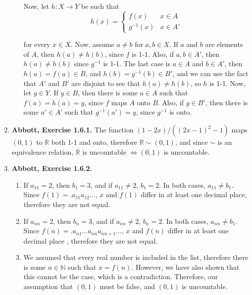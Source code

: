 \documentclass{article}
\newcommand{\N}{\mathbb{N}}
\newcommand{\R}{\mathbb{R}}
\newcommand{\exc}[2][Abbott]{\item \textbf{#1, Exercise #2.}}
\begin{document}
\begin{enumerate}
\begin{enumerate}
		      Now, let $h : X \rightarrow Y$ be such that 
		      \begin{equation*}
		      	h(x) = \begin{cases}
		      	f(x) & x \in A \\ 
		      	g^{-1}(x) & x \in A'
		      	\end{cases}
		      \end{equation*}
		      		      		      	      	      	      	              
		      for every $x \in X$. Now, assume $a \neq b$ for $a, b \in X$. If $a$ and $b$ are elements of $A$, then $h(a) \neq h(b)$, since $f$ is 1-1. Also, if $a,b \in A'$, then $h(a) \neq h(b)$ since $g^{-1}$ is 1-1. The last case is $a \in A$ and $b \in A'$, then $h(a)=f(a) \in B$, and $h(b)=g^{-1}(b) \in B'$, and we can use the fact that $A'$ and $B'$ are disjoint to see that $h(a) \neq h(b)$, so $h$ is 1-1. Now, let $y \in Y$. If $y \in B$, then there is some $a \in A$ such that $f(a)=h(a)=y$, since $f$ maps $A$ onto $B$. Also, if $y \in B'$, then there is some $a' \in A'$ such that $g^{-1}(a') = y$, since $g^{-1}$ is onto.
	\end{enumerate}
				      	          
	\exc{1.6.1}
	The function $(1-2x)/((2x-1)^2-1)$ maps $(0, 1)$ to $\R$ both 1-1 and onto, therefore $\R \sim (0, 1)$, and since $\sim$ is an equivalence relation, $\R$ is uncountable $\iff (0, 1)$ is uncountable. 
				      	          
	\exc{1.6.2}
	\begin{enumerate}
		\item If $a_{11} = 2$, then $b_1 = 3$, and if $a_{11} \neq 2$, $b_1 = 2$. In both cases, $a_{11} \neq b_1$. Since $f(1) = .a_{11} a_{12} \dots$, $x$ and $f(1)$ differ in at least one decimal place, therefore they are not equal.
		      		      		      	      	      	      	              
		\item If $a_{nn} = 2$, then $b_n = 3$, and if $a_{nn} \neq 2$, $b_n = 2$. In both cases, $a_{nn} \neq b_1$. Since $f(n) = .a_{n 1} \dots a_{nn} a_{n n+1} \dots$, $x$ and $f(n)$ differ in at least one decimal place , therefore they are not equal.
		      		      		      	      	      	      	              
		\item We assumed that every real number is included in the list, therefore there is some $n \in \N$ such that $x = f(n)$. However, we have also shown that this cannot be the case, which is a contradiction. Therefore, our assumption that $(0, 1)$ must be false, and $(0, 1)$ is uncountable.
	\end{enumerate}
				      	          

\end{enumerate}
\end{document}
